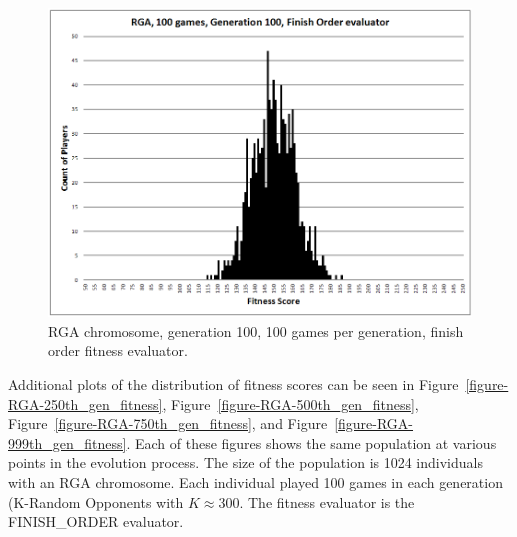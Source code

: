 \begin{figure}[htp]
\centerline{\includegraphics[width=0.75\columnwidth]{Figures/RGA_1024_G100_N100_FO.png}}
\caption[RGA Fitness Distribution, 100th Generation]{RGA chromosome, generation
100, 100 games per generation, finish order fitness evaluator.}
\label{figure-100th_gen_fitness}
\end{figure}

Additional plots of the distribution of fitness scores can be seen in
Figure~\ref{figure-RGA-250th_gen_fitness},
Figure~\ref{figure-RGA-500th_gen_fitness},
Figure~\ref{figure-RGA-750th_gen_fitness}, and
Figure~\ref{figure-RGA-999th_gen_fitness}. Each of these figures shows the same
population at various points in the evolution process. The size of the
population is 1024 individuals with an RGA chromosome. Each individual played
100 games in each generation (K-Random Opponents with \(K\approx300\). The
fitness evaluator is the FINISH\_ORDER evaluator.

